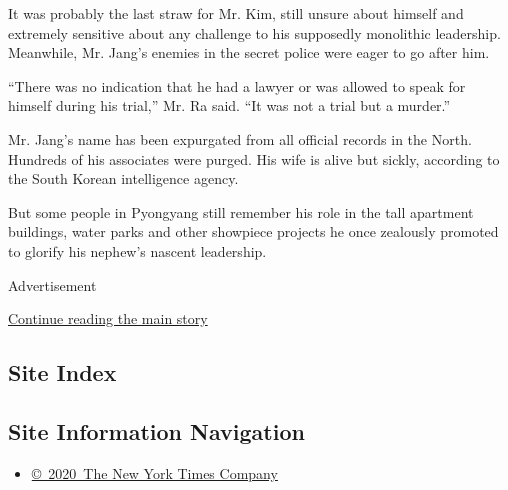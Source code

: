 It was probably the last straw for Mr. Kim, still unsure about himself
and extremely sensitive about any challenge to his supposedly monolithic
leadership. Meanwhile, Mr. Jang's enemies in the secret police were
eager to go after him.

``There was no indication that he had a lawyer or was allowed to speak
for himself during his trial,'' Mr. Ra said. ``It was not a trial but a
murder.''

Mr. Jang's name has been expurgated from all official records in the
North. Hundreds of his associates were purged. His wife is alive but
sickly, according to the South Korean intelligence agency.

But some people in Pyongyang still remember his role in the tall
apartment buildings, water parks and other showpiece projects he once
zealously promoted to glorify his nephew's nascent leadership.

Advertisement

\protect\hyperlink{after-bottom}{Continue reading the main story}

\hypertarget{site-index}{%
\subsection{Site Index}\label{site-index}}

\hypertarget{site-information-navigation}{%
\subsection{Site Information
Navigation}\label{site-information-navigation}}

\begin{itemize}
\tightlist
\item
  \href{https://help.nytimes3xbfgragh.onion/hc/en-us/articles/115014792127-Copyright-notice}{©~2020~The
  New York Times Company}
\end{itemize}

